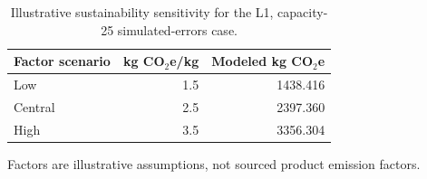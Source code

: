 \begin{table}[!t]
\caption{Illustrative sustainability sensitivity for the L1, capacity-25 simulated-errors case.}
\label{tab:sustainability}\centering\footnotesize
\begin{tabular}{lrr}
\toprule
Factor scenario & kg CO$_2$e/kg & Modeled kg CO$_2$e \\
\midrule
Low & 1.5 & 1438.416 \\
Central & 2.5 & 2397.360 \\
High & 3.5 & 3356.304 \\
\bottomrule
\end{tabular}
\par\vspace{3pt}\footnotesize Factors are illustrative assumptions, not sourced product emission factors.
\end{table}
